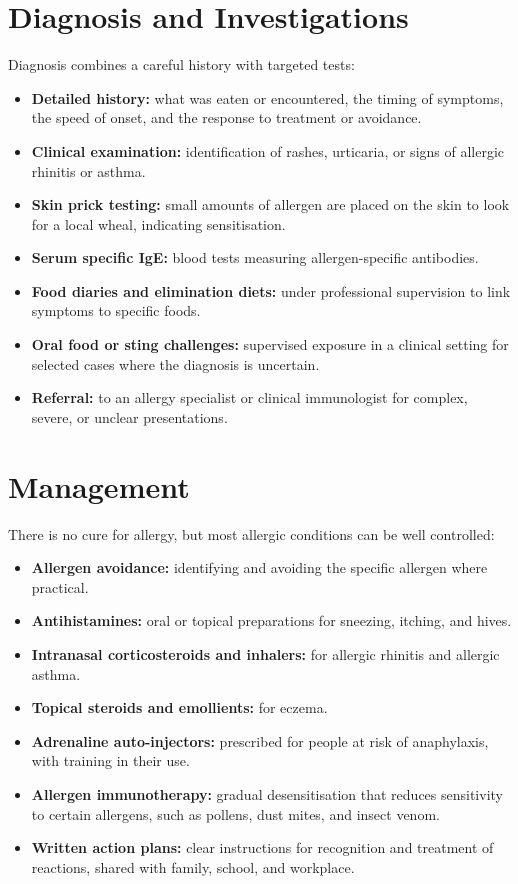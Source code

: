 \section*{Diagnosis and Investigations}
Diagnosis combines a careful history with targeted tests:

\begin{itemize}
    \item \textbf{Detailed history:} what was eaten or encountered, the timing of symptoms, the speed of onset, and the response to treatment or avoidance.
    \item \textbf{Clinical examination:} identification of rashes, urticaria, or signs of allergic rhinitis or asthma.
    \item \textbf{Skin prick testing:} small amounts of allergen are placed on the skin to look for a local wheal, indicating sensitisation.
    \item \textbf{Serum specific IgE:} blood tests measuring allergen-specific antibodies.
    \item \textbf{Food diaries and elimination diets:} under professional supervision to link symptoms to specific foods.
    \item \textbf{Oral food or sting challenges:} supervised exposure in a clinical setting for selected cases where the diagnosis is uncertain.
    \item \textbf{Referral:} to an allergy specialist or clinical immunologist for complex, severe, or unclear presentations.
\end{itemize}

\section*{Management}
There is no cure for allergy, but most allergic conditions can be well controlled:

\begin{itemize}
    \item \textbf{Allergen avoidance:} identifying and avoiding the specific allergen where practical.
    \item \textbf{Antihistamines:} oral or topical preparations for sneezing, itching, and hives.
    \item \textbf{Intranasal corticosteroids and inhalers:} for allergic rhinitis and allergic asthma.
    \item \textbf{Topical steroids and emollients:} for eczema.
    \item \textbf{Adrenaline auto-injectors:} prescribed for people at risk of anaphylaxis, with training in their use.
    \item \textbf{Allergen immunotherapy:} gradual desensitisation that reduces sensitivity to certain allergens, such as pollens, dust mites, and insect venom.
    \item \textbf{Written action plans:} clear instructions for recognition and treatment of reactions, shared with family, school, and workplace.
\end{itemize}

